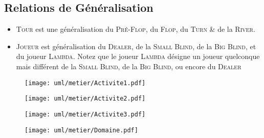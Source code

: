 \subsection{Relations de Généralisation}
\begin{itemize}
	\item \textsc{Tour} est une généralisation du \textsc{Pré-Flop}, du 
	      \textsc{Flop}, du \textsc{Turn} \& de la \textsc{River}.
	\item \textsc{Joueur} est généralisation du \textsc{Dealer}, de la 
	      \textsc{Small Blind}, de la \textsc{Big Blind}, et du joueur 
	      \textsc{Lambda}. Notez que le joueur \textsc{Lambda} désigne un joueur
	      quelconque mais différent de la \textsc{Small Blind}, de la
	      \textsc{Big Blind}, ou encore du \textsc{Dealer}
\end{itemize}

\begin{figure}[ht]
	\texttt{[image: uml/metier/Activite1.pdf]}
\end{figure}


\begin{figure}[ht]
	\centering \texttt{[image: uml/metier/Activite2.pdf]}
\end{figure}

\begin{figure}[ht]
	\centering \texttt{[image: uml/metier/Activite3.pdf]}
\end{figure}

\begin{figure}[ht]
	\centering \texttt{[image: uml/metier/Domaine.pdf]}
\end{figure}
